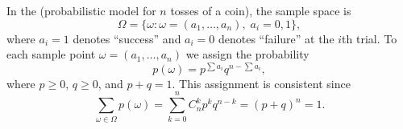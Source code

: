In the  (probabilistic model for $n$ tosses of a coin), the sample space is
$$\Omega = \{\omega : \omega = (a_1, \ldots, a_n), \; a_i = 0, 1\},$$
where $a_i = 1$ denotes ``success'' and $a_i = 0$ denotes ``failure'' at the $i$th trial. To each sample point $\omega = (a_1, \ldots, a_n)$ we assign the probability
$$p(\omega) = p^{\sum a_i} q^{n - \sum a_i},$$
where $p \geq 0$, $q \geq 0$, and $p + q = 1$. This assignment is consistent since
$$\sum_{\omega \in \Omega} p(\omega) = \sum_{k=0}^{n} C_n^k p^k q^{n-k} = (p + q)^n = 1.$$
